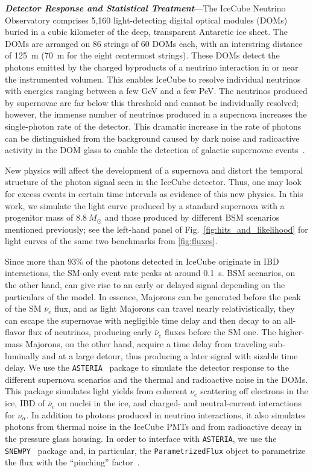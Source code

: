 \documentclass[aps,twocolumn,prl,showpacs,showkeys,preprintnumbers,superscriptaddress,nobibnotes,floatfix,longbibliography,notitlepage,nofootinbib]{revtex4-2}
\begin{document}
\textbf{\textit{Detector Response and Statistical Treatment}}---The IceCube Neutrino Observatory comprises 5,160 light-detecting digital optical modules (DOMs) buried in a cubic kilometer of the deep, transparent Antarctic ice sheet.
The DOMs are arranged on 86 strings of 60 DOMs each, with an interstring distance of 125~m (70~m for the eight centermost strings).
These DOMs detect the photons emitted by the charged byproducts of a neutrino interaction in or near the instrumented volumen.
This enables IceCube to resolve individual neutrinos with energies ranging between a few GeV and a few PeV.
The neutrinos produced by supernovae are far below this threshold and cannot be individually resolved; however, the immense number of neutrinos produced in a supernova increases the single-photon rate of the detector.
This dramatic increase in the rate of photons can be distinguished from the background caused by dark noise and radioactive activity in the DOM glass to enable the detection of galactic supernovae events~\cite{Griswold:2023iwz}.

New physics will affect the development of a supernova and distort the temporal structure of the photon signal seen in the IceCube detector.
Thus, one may look for excess events in certain time intervals as evidence of this new physics.
In this work, we simulate the light curve produced by a standard supernova with a progenitor mass of $8.8~M_{\odot}$ and those produced by different BSM scenarios mentioned previously; see the left-hand panel of Fig.~\ref{fig:hits_and_likelihood} for light curves of the same two benchmarks from \cref{fig:fluxes}.

Since more than 93\% of the photons detected in IceCube originate in IBD interactions, the SM-only event rate peaks at around 0.1~s.
BSM scenarios, on the other hand, can give rise to an early or delayed signal depending on the particulars of the model.
In essence, Majorons can be generated before the peak of the SM $\bar{\nu}_{e}$ flux, and as light Majorons can travel nearly relativistically, they can escape the supernovae with negligible time delay and then decay to an all-flavor flux of neutrinos, producing early $\bar{\nu}_{e}$ fluxes before the SM one.
The higher-mass Majorons, on the other hand, acquire a time delay from traveling sub-luminally and at a large detour, thus producing a later signal with sizable time delay.
We use the \texttt{ASTERIA}~\cite{spencer_griswold_2020_3926835} package to simulate the detector response to the different supernova scenarios and the thermal and radioactive noise in the DOMs.
This package simulates light yields from coherent $\nu_{e}$ scattering off electrons in the ice, IBD of $\bar{\nu}_{e}$ on nuclei in the ice, and charged- and neutral-current interactions for $\nu_{\alpha}$. In addition to photons produced in neutrino interactions, it also simulates photons from thermal noise in the IceCube PMTs and from radioactive decay in the pressure glass housing.
In order to interface with \texttt{ASTERIA}, we use the \texttt{SNEWPY}~\cite{SNEWS:2021ewj} package and, in particular, the \texttt{ParametrizedFlux} object to parametrize the flux with the ``pinching'' factor~\cite{Keil:2002in,SNEWS:2021ewj}.
\end{document}
